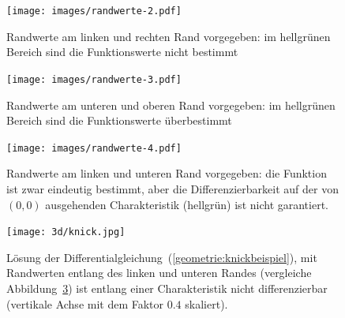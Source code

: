 \begin{figure}
\begin{center}
\texttt{[image: images/randwerte-2.pdf]}
\end{center}
\caption{Randwerte am linken und rechten Rand vorgegeben: im hellgrünen
Bereich sind die Funktionswerte nicht bestimmt \label{geometrie:charrand1}}
\end{figure}

\begin{figure}
\begin{center}
\texttt{[image: images/randwerte-3.pdf]}
\end{center}
\caption{Randwerte am unteren und oberen Rand vorgegeben: im hellgrünen
Bereich sind die Funktionswerte überbestimmt \label{geometrie:charrand2}}
\end{figure}

\begin{figure}
\begin{center}
\texttt{[image: images/randwerte-4.pdf]}
\end{center}
\caption{Randwerte am linken und unteren Rand vorgegeben: die Funktion
ist zwar eindeutig bestimmt, aber die Differenzierbarkeit auf
der von $(0,0)$ ausgehenden Charakteristik (hellgrün) ist nicht garantiert.
\label{geometrie:charrand3}}
\end{figure}

\begin{figure}
\centering
\texttt{[image: 3d/knick.jpg]}
\caption{Lösung der Differentialgleichung~(\ref{geometrie:knickbeispiel}),
mit Randwerten entlang des linken und unteren Randes (vergleiche
Abbildung~\ref{geometrie:charrand3}) ist entlang einer Charakteristik
nicht differenzierbar (vertikale Achse mit dem Faktor $0.4$ skaliert).
\label{geometrie:knick}}
\end{figure}

